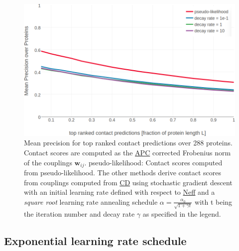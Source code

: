 \documentclass[11pt,a4paper,twoside]{book}
\newcommand{\wij}{\mathbf{w}_{ij}}
\theoremstyle{definition}
\theoremstyle{definition}
\theoremstyle{remark}
\begin{document}
\begin{figure}

{\centering \includegraphics[width=1\linewidth]{img/full_likelihood/appendix/precision_vs_rank_alpha0_0_sqrt_decayrate} 

}

\caption{Mean precision for top ranked
contact predictions over 288 proteins. Contact scores are computed as
the \protect\hyperlink{abbrev}{APC} corrected Frobenius norm of the
couplings \(\wij\). pseudo-likelihood: Contact scores computed from
pseudo-likelihood. The other methods derive contact scores from
couplings computed from \protect\hyperlink{abbrev}{CD} using stochastic
gradient descent with an initial learning rate defined with respect to
\protect\hyperlink{abbrev}{Neff} and a \emph{square root} learning rate
annealing schedule \(\alpha = \frac{\alpha_0}{\sqrt{1 + \gamma t}}\)
with t being the iteration number and decay rate \(\gamma\) as specified
in the legend.}\label{fig:performance-cd-sqrtschedule}
\end{figure}

\subsection{Exponential learning rate
schedule}\label{exponential-learning-rate-schedule}
\end{document}

